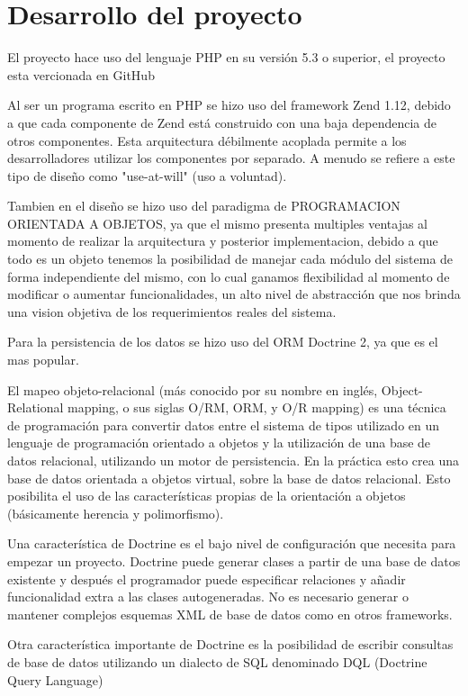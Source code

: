 \documentclass[letterpaper,11pt]{article}
\begin{document}
\section{Desarrollo del proyecto}
El proyecto hace uso del lenguaje PHP en su versión 5.3 o superior, el proyecto esta vercionada en GitHub 

Al ser un programa escrito en PHP se hizo uso del framework Zend 1.12, debido a que cada componente de Zend está construido con una baja dependencia de otros componentes. Esta arquitectura débilmente acoplada permite a los desarrolladores utilizar los componentes por separado. A menudo se refiere a este tipo de diseño como "use-at-will" (uso a voluntad).

Tambien en el diseño se hizo uso del paradigma de PROGRAMACION ORIENTADA A OBJETOS, ya que el mismo presenta multiples ventajas al  momento de realizar la arquitectura y posterior implementacion, debido a que todo es un objeto tenemos la posibilidad de manejar cada módulo del sistema de forma independiente del mismo, con lo cual ganamos flexibilidad al momento de modificar o aumentar funcionalidades, un alto nivel de abstracción que nos brinda una vision objetiva de los requerimientos reales del sistema. 

Para la persistencia de los datos se hizo uso del ORM Doctrine 2, ya que es el mas popular.	

El mapeo objeto-relacional (más conocido por su nombre en inglés, Object-Relational mapping, o sus siglas O/RM, ORM, y O/R mapping) es una técnica de programación para convertir datos entre el sistema de tipos utilizado en un lenguaje de programación orientado a objetos y la utilización de una base de datos relacional, utilizando un motor de persistencia. En la práctica esto crea una base de datos orientada a objetos virtual, sobre la base de datos relacional. Esto posibilita el uso de las características propias de la orientación a objetos (básicamente herencia y polimorfismo).

Una característica de Doctrine es el bajo nivel de configuración que necesita para empezar un proyecto. Doctrine puede generar clases a partir de una base de datos existente y después el programador puede especificar relaciones y añadir funcionalidad extra a las clases autogeneradas. No es necesario generar o mantener complejos esquemas XML de base de datos como en otros frameworks.

Otra característica importante de Doctrine es la posibilidad de escribir consultas de base de datos utilizando un dialecto de SQL denominado DQL (Doctrine Query Language)
\end{document}
